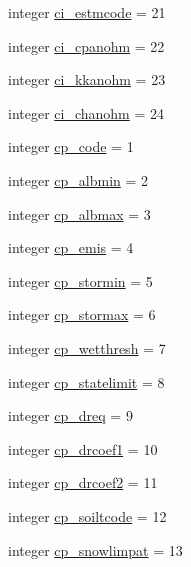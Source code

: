 \begin{DoxyCompactItemize}
\item 
integer \hyperlink{namespacecolnamesinputfiles_a20ecd4ea66a4c0db6adf4c07786ed888}{ci\+\_\+estmcode} = 21
\item 
integer \hyperlink{namespacecolnamesinputfiles_ac575448f7cd32bb1c4f0498c6ad06ce2}{ci\+\_\+cpanohm} = 22
\item 
integer \hyperlink{namespacecolnamesinputfiles_a03e019e33b459e1ec60dac2b255e855f}{ci\+\_\+kkanohm} = 23
\item 
integer \hyperlink{namespacecolnamesinputfiles_ac9bea22a1fcf8544d503fd4844d70c89}{ci\+\_\+chanohm} = 24
\item 
integer \hyperlink{namespacecolnamesinputfiles_ab2ca2803ce3dfc8561661c95706214f3}{cp\+\_\+code} = 1
\item 
integer \hyperlink{namespacecolnamesinputfiles_aab15b20d4124b71f85c7a104e53bea16}{cp\+\_\+albmin} = 2
\item 
integer \hyperlink{namespacecolnamesinputfiles_a85b7aae31305b8708ef744a4b85b09a7}{cp\+\_\+albmax} = 3
\item 
integer \hyperlink{namespacecolnamesinputfiles_a22912542114e1af66f477bf7fa7cb5fb}{cp\+\_\+emis} = 4
\item 
integer \hyperlink{namespacecolnamesinputfiles_a5503aa0af956bc5f68cf462e5b70a7f4}{cp\+\_\+stormin} = 5
\item 
integer \hyperlink{namespacecolnamesinputfiles_a3e39597df40b3e58c35082b381dddbac}{cp\+\_\+stormax} = 6
\item 
integer \hyperlink{namespacecolnamesinputfiles_a8e548544469fb8f359551f0aea2d2069}{cp\+\_\+wetthresh} = 7
\item 
integer \hyperlink{namespacecolnamesinputfiles_a06581c0ce3961889b7b9f77b1a490c5d}{cp\+\_\+statelimit} = 8
\item 
integer \hyperlink{namespacecolnamesinputfiles_a725b7724166ff38221e454e7eae16f13}{cp\+\_\+dreq} = 9
\item 
integer \hyperlink{namespacecolnamesinputfiles_a455b13d56e3208b142276baeae8a7809}{cp\+\_\+drcoef1} = 10
\item 
integer \hyperlink{namespacecolnamesinputfiles_ae88715acb6cf39ee3799b87791a64048}{cp\+\_\+drcoef2} = 11
\item 
integer \hyperlink{namespacecolnamesinputfiles_adb82da2e8ebded2ece6d2004655f1ecb}{cp\+\_\+soiltcode} = 12
\item 
integer \hyperlink{namespacecolnamesinputfiles_a6ddb8f287fb7a2cb41191c76325b5753}{cp\+\_\+snowlimpat} = 13
\item 

\end{DoxyCompactItemize}
